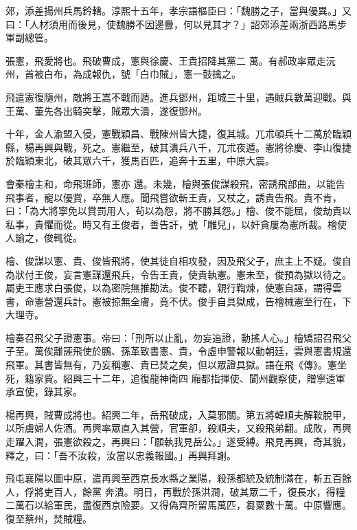 \begin{pinyinscope}
 郊，添差揚州兵馬鈐轄。淳熙十五年，孝宗語樞臣曰：「魏勝之子，當與優異。」又曰：「人材須用而後見，使魏勝不因邊釁，何以見其才？」詔郊添差兩浙西路馬步軍副總管。



 張憲，飛愛將也。飛破曹成，憲與徐慶、王貴招降其黨二
 萬。有郝政率眾走沅州，首被白布，為成報仇，號「白巾賊」，憲一鼓擒之。



 飛遣憲復隨州，敵將王嵩不戰而遁。進兵鄧州，距城三十里，遇賊兵數萬迎戰。與王萬、董先各出騎突擊，賊眾大潰，遂復鄧州。



 十年，金人渝盟入侵，憲戰穎昌、戰陳州皆大捷，復其城。兀朮頓兵十二萬於臨穎縣，楊再興與戰，死之。憲繼至，破其潰兵八千，兀朮夜遁。憲將徐慶、李山復捷於臨穎東北，破其眾六千，獲馬百匹，追奔十五里，中原大震。



 會秦檜主和，命飛班師，憲亦
 還。未幾，檜與張俊謀殺飛，密誘飛部曲，以能告飛事者，寵以優賞，卒無人應。聞飛嘗欲斬王貴，又杖之，誘貴告飛。貴不肯，曰：「為大將寧免以賞罰用人，茍以為怨，將不勝其怨。」檜、俊不能屈，俊劫貴以私事，貴懼而從。時又有王俊者，善告訐，號「雕兒」，以奸貪屢為憲所裁。檜使人諭之，俊輒從。



 檜、俊謀以憲、貴、俊皆飛將，使其徒自相攻發，因及飛父子，庶主上不疑。俊自為狀付王俊，妄言憲謀還飛兵，令告王貴，使貴執憲。憲未至，俊預為獄以待之。
 屬吏王應求白張俊，以為密院無推勘法。俊不聽，親行鞫煉，使憲自誣，謂得雲書，命憲營還兵計。憲被掠無全膚，竟不伏。俊手自具獄成，告檜械憲至行在，下大理寺。



 檜奏召飛父子證憲事。帝曰：「刑所以止亂，勿妄追證，動搖人心。」檜矯詔召飛父子至。萬俟離誣飛使於鵬、孫革致書憲、貴，令虛申警報以動朝廷，雲與憲書規還飛軍。其書皆無有，乃妄稱憲、貴已焚之矣，但以眾證具獄。語在飛《傳》。憲坐死，籍家貲。紹興三十二年，追復龍神衛四
 廂都指揮使、閬州觀察使，贈寧遠軍承宣使，錄其家。



 楊再興，賊曹成將也。紹興二年，岳飛破成，入莫邪關。第五將韓順夫解鞍脫甲，以所虜婦人佐酒。再興率眾直入其營，官軍卻，殺順夫，又殺飛弟翻。成敗，再興走躍入澗，張憲欲殺之，再興曰：「願執我見岳公。」遂受縛。飛見再興，奇其貌，釋之，曰：「吾不汝殺，汝當以忠義報國。」再興拜謝。



 飛屯襄陽以圖中原，遣再興至西京長水縣之業陽，殺孫都統及統制滿在，斬五百餘人，俘將吏百人，餘黨
 奔潰。明日，再戰於孫洪澗，破其眾二千，復長水，得糧二萬石以給軍民，盡復西京險要。又得偽齊所留馬萬匹，芻粟數十萬。中原響應。復至蔡州，焚賊糧。




\end{pinyinscope}
